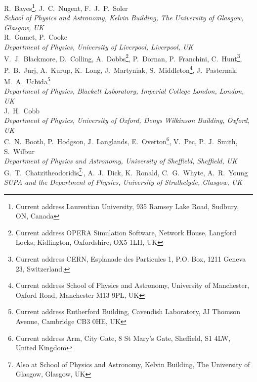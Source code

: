 R.~Bayes\footnote{Current address Laurentian University, 935 Ramsey Lake Road, Sudbury, ON, Canada},  J.~C.~Nugent, F.~J.~P.~Soler
\\{\it
School of Physics and Astronomy, Kelvin Building, The University of Glasgow, Glasgow, UK
}\\

R.~Gamet, P.~Cooke
\\{\it
Department of Physics, University of Liverpool, Liverpool, UK
}\\

V.~J.~Blackmore, D.~Colling, A.~Dobbs\footnote{Current address OPERA Simulation Software, Network House, Langford Locks, Kidlington, Oxfordshire, OX5 1LH, UK}, P.~Dornan, P.~Franchini, C.~Hunt\footnote{Current address CERN, Esplanade des Particules 1, P.O. Box, 1211 Geneva 23, Switzerland.}, P.~B.~Jurj, A.~Kurup, K.~Long, J.~Martyniak,  S.~Middleton\footnote{Current address School of Physics and Astronomy, University of Manchester, Oxford Road, Manchester M13 9PL, UK}, J.~Pasternak, M.~A.~Uchida\footnote{Current address Rutherford Building, Cavendish Laboratory, JJ Thomson Avenue, Cambridge CB3 0HE, UK}
\\{\it
Department of Physics, Blackett Laboratory, Imperial College London, London, UK
}\\

J.~H.~Cobb
\\{\it
Department of Physics, University of Oxford, Denys Wilkinson Building, Oxford, UK
}\\

C.~N.~Booth, P.~Hodgson, J.~Langlands, E.~Overton\footnote{Current address Arm, City Gate, 8 St Mary's Gate, Sheffield, S1 4LW, United Kingdom}, V.~Pec,  P.~J.~Smith, S.~Wilbur
\\{\it
Department of Physics and Astronomy, University of Sheffield, Sheffield, UK
}\\

G.~T.~Chatzitheodoridis\footnote{Also at School of Physics and Astronomy, Kelvin Building, The University of Glasgow, Glasgow, UK}$^,$\footnotemark, A.~J.~Dick\footnotemark[\value{footnote}],  K.~Ronald\footnotemark[\value{footnote}], C.~G.~Whyte\footnotemark[\value{footnote}], A.~R.~Young\footnotemark[\value{footnote}]
\\{\it
SUPA and the Department of Physics, University of Strathclyde, Glasgow, UK
}\\

